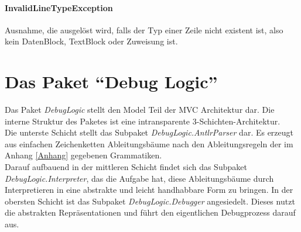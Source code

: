 \documentclass[parskip=full]{scrartcl}
\begin{document}
\paragraph{InvalidLineTypeException}
Ausnahme, die ausgelöst wird, falls der Typ einer Zeile nicht existent ist, also kein DatenBlock, TextBlock oder Zuweisung ist.

\newpage
\section{Das Paket \enquote{Debug Logic}}
\label{DebugLogic}
Das Paket \textit{DebugLogic} stellt den Model Teil der MVC Architektur dar. Die interne Struktur des Paketes ist eine intransparente 3-Schichten-Architektur.\\
Die unterste Schicht stellt das Subpaket \textit{DebugLogic.AntlrParser} dar. Es erzeugt aus einfachen Zeichenketten Ableitungsbäume nach den Ableitungsregeln der im Anhang \ref{Anhang} gegebenen Grammatiken.\\ Darauf aufbauend in der mittleren Schicht findet sich das Subpaket \textit{DebugLogic.Interpreter}, das die Aufgabe hat, diese Ableitungsbäume durch Interpretieren in eine abstrakte und leicht handhabbare Form zu bringen. In der obersten Schicht ist das Subpaket \textit{DebugLogic.Debugger} angesiedelt. Dieses nutzt die abstrakten Repräsentationen und führt den eigentlichen Debugprozess darauf aus.
\end{document}

